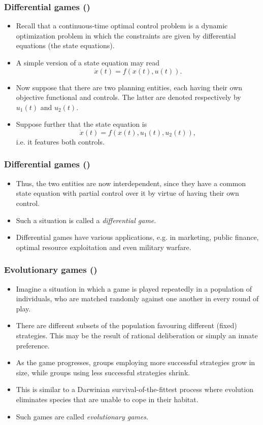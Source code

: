 \documentclass[10pt]{beamer}
\theoremstyle{definition}
\begin{document}
\begin{frame}[fragile]\setcounter{slidenum}{1}
\frametitle{Differential games ()}
\begin{itemize}\itemsep1em
\item Recall that a continuous-time optimal control problem is a dynamic optimization problem in which the constraints are given by differential equations (the state equations). 
\item A simple version of a state equation may read \[ \dot{x}(t) = f(x(t),u(t)). \]
\item Now suppose that there are two planning entities, each having their own objective functional and controls. The latter are denoted respectively by $ u_1(t) $ and $ u_2(t) $.
\item Suppose further that the state equation is \[ \dot{x}(t) = f(x(t),u_1(t),u_2(t)), \]
i.e. it features both controls.
\end{itemize}
\end{frame}

\begin{frame}[fragile]
\frametitle{Differential games ()}
\begin{itemize}\itemsep1em
\item Thus, the two entities are now interdependent, since they have a common state equation with partial control over it by virtue of having their own control.
\item Such a situation is called a \emph{differential game}. 
\item Differential games have various applications, e.g. in marketing, public finance, optimal resource exploitation and even military warfare.
\end{itemize}
\end{frame}

\setcounter{slidenum}{1}
\begin{frame}[fragile]
\frametitle{Evolutionary games ()}
\begin{itemize}\itemsep1em
\item Imagine a situation in which a game is played repeatedly in a population of individuals, who are matched randomly against one another in every round of play.
\item There are different subsets of the population favouring different (fixed) strategies. This may be the result of rational deliberation or simply an innate preference.
\item As the game progresses, groups employing more successful strategies grow in size, while groups using less successful strategies shrink.
\item This is similar to a Darwinian survival-of-the-fittest process where evolution eliminates species that are unable to cope in their habitat.
\item Such games are called \emph{evolutionary games}.
\end{itemize}
\end{frame}
\end{document}
